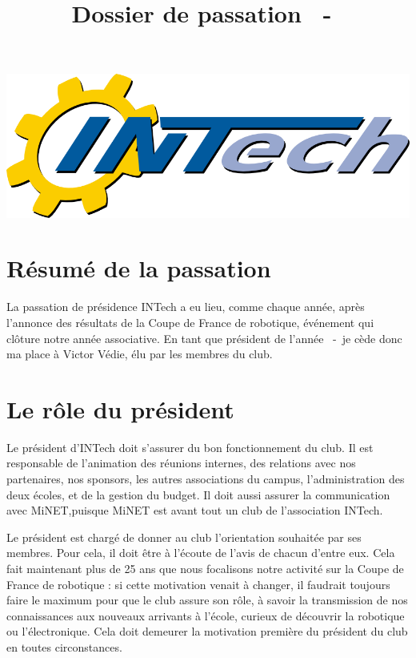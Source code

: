 \documentclass[a4paper,10pt]{article}
\title{Dossier de passation \theannee~-~\theanneesuiv}
\author{\ancienprez}
\newcommand{\nouveauprez}{Victor Védie}
\newcounter{annee}
\newcounter{anneeprec}
\begin{document}
\maketitle

\begin{center}
\includegraphics[scale=0.3]{logo-grand.png}
\end{center}


\section{Résumé de la passation}

La passation de présidence INTech a eu lieu, comme chaque année, après l'annonce des résultats de la Coupe de France de robotique, 
événement qui clôture notre année associative. En tant que président de l'année \theanneeprec~-~\theannee \space je cède donc ma place à 
\nouveauprez, élu par les membres du club. 

\section{Le rôle du président}

Le président d'INTech doit s'assurer du bon fonctionnement du club. Il est responsable de l'animation des réunions internes,
des relations avec nos partenaires, nos sponsors, les autres associations du campus, l'administration des deux écoles, et de la gestion du budget.
Il doit aussi assurer la communication avec MiNET,puisque MiNET est avant tout un club de l'association INTech. \newline

Le président est chargé de donner au club l'orientation souhaitée par ses membres. Pour cela, il doit être à l'écoute de l'avis de chacun d'entre eux.
Cela fait maintenant plus de 25 ans que nous focalisons notre activité sur la Coupe de France de robotique : si cette motivation venait à changer, il faudrait toujours 
faire le maximum pour que le club assure son rôle, à savoir la transmission de nos connaissances aux nouveaux arrivants à l'école,
curieux de découvrir la robotique ou l'électronique. Cela doit demeurer la motivation première du président du club en toutes circonstances.\newline
\end{document}
